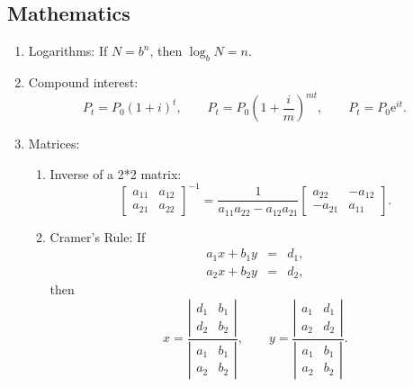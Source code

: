 \subsection{Mathematics}

\begin{enumerate}
	\item Logarithms: If $N=b^{n}$, then $\log _{b}N=n.$
	
	\item Compound interest:%
	\begin{equation*}
	P_{t}=P_{0}\left( 1+i\right) ^{t},\qquad P_{t}=P_{0}\left( 1+\frac{i}{m}%
	\right) ^{mt},\qquad P_{t}=P_{0}\mathrm{e}^{it}.
	\end{equation*}
	
	\item Matrices:
	
	\begin{enumerate}
		\item Inverse of a 2*2 matrix:
		\begin{equation*}
		\left[
		\begin{array}{cc}
		a_{11} & a_{12} \\
		a_{21} & a_{22}%
		\end{array}%
		\right] ^{-1}=\frac{1}{a_{11}a_{22}-a_{12}a_{21}}\left[
		\begin{array}{cc}
		a_{22} & -a_{12} \\
		-a_{21} & a_{11}%
		\end{array}%
		\right] .
		\end{equation*}
		
		
		
		\item Cramer's Rule: If
		\begin{eqnarray*}
			a_{1}x+b_{1}y &=&d_{1}, \\
			a_{2}x+b_{2}y &=&d_{2},
		\end{eqnarray*}%
		then%
		\begin{equation*}
		x=\frac{\left\vert
			\begin{array}{cc}
			d_{1} & b_{1} \\
			d_{2} & b_{2}%
			\end{array}%
			\right\vert }{\left\vert
			\begin{array}{cc}
			a_{1} & b_{1} \\
			a_{2} & b_{2}%
			\end{array}%
			\right\vert },\qquad y=\frac{\left\vert
			\begin{array}{cc}
			a_{1} & d_{1} \\
			a_{2} & d_{2}%
			\end{array}%
			\right\vert }{\left\vert
			\begin{array}{cc}
			a_{1} & b_{1} \\
			a_{2} & b_{2}%
			\end{array}%
			\right\vert }.
		\end{equation*}
	\end{enumerate}
\end{enumerate}


